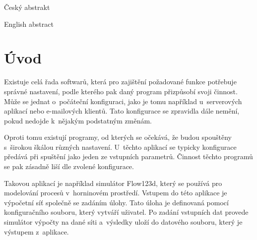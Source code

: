 \documentclass[FM,bw,DP]{tulthesis}
\begin{document}

\begin{abstractCZ}
\thispagestyle{empty}
Český abstrakt
\end{abstractCZ}

\vspace{2cm}
\begin{abstractEN}
English abstract
\end{abstractEN}

\clearpage
\begin{acknowledgement}

\end{acknowledgement}

\renewcommand\contentsname{Obsah\vspace{-30pt}}
\tableofcontents
\clearpage



\printnoidxglossary[type=\acronymtype,title=Seznam zkratek]



\chapter*{Úvod}

Existuje celá řada softwarů, která pro zajištění požadované funkce potřebuje správné nastavení, podle kterého pak daný program přizpůsobí svoji činnost. Může se jednat o~počáteční konfiguraci, jako je tomu například u~serverových aplikací nebo e-mailových klientů. Tato konfigurace se zpravidla dále nemění, pokud nedojde k~nějakým podstatným změnám.

Oproti tomu existují programy, od kterých se očekává, že budou spouštěny s~širokou škálou různých nastavení. U~těchto aplikací se typicky konfigurace předává při spuštění jako jeden ze vstupních parametrů. Činnost těchto programů se pak zásadně liší dle zvolené konfigurace.

Takovou aplikací je například simulátor Flow123d, který se používá pro modelování procesů v~horninovém prostředí. Vstupem do této aplikace je výpočetní síť společně se zadáním úlohy. Tato úloha je definovaná pomocí konfiguračního souboru, který vytváří uživatel. Po zadání vstupních dat provede simulátor výpočty na dané síti a~výsledky uloží do datového souboru, který je výstupem z~aplikace.
\end{document}
